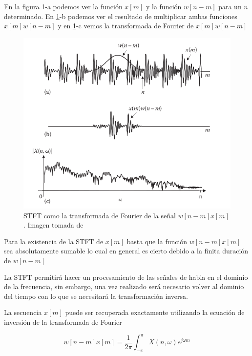 En la figura \ref{fig:ch2_stft_explained}-a podemos ver la función $x[m]$ y la función $w[n-m]$ para un $n$ determinado. En \ref{fig:ch2_stft_explained}-b podemos ver el resultado de multiplicar ambas funciones $x[m]w[n-m]$ y en \ref{fig:ch2_stft_explained}-c vemos la transformada de Fourier de $x[m]w[n-m]$

\begin{figure}
	\centering
	\centerline{\includegraphics[scale=0.7]{images/ch2/stft_explained.png}}
	\caption{STFT como la transformada de Fourier de la señal $w[n-m] x[m]$. Imagen tomada de \cite{speech_enhancement_theory_and_practice}}
	\label{fig:ch2_stft_explained}
\end{figure}

Para la existencia de la STFT de $x[m]$ basta que la función $w[n-m]x[m]$ sea absolutamente sumable \cite{oppenheim_schafer} lo cual en general es cierto debido a la finita duración de $w[n-m]$

La STFT permitirá hacer un procesamiento de las señales de habla en el dominio de la frecuencia, sin embargo, una vez realizado será necesario volver al dominio del tiempo con lo que se necesitará la transformación inversa.

La secuencia $x[m]$ puede ser recuperada exactamente utilizando la ecuación de inversión de la transformada de Fourier

\begin{equation*}
	w[n-m] x[m] = \frac{1}{2 \pi} \int_{- \pi}^{\pi} X(n, \omega) e^{j \omega m}
\end{equation*}

